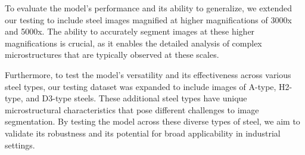 \documentclass[]{article}
\begin{document}
To evaluate the model's performance and its ability to generalize, we extended our testing to include steel images magnified at higher magnifications of 3000x and 5000x. The ability to accurately segment images at these higher magnifications is crucial, as it enables the detailed analysis of complex microstructures that are typically observed at these scales.

Furthermore, to test the model's versatility and its effectiveness across various steel types, our testing dataset was expanded to include images of A-type, H2-type, and D3-type steels. These additional steel types have unique microstructural characteristics that pose different challenges to image segmentation. By testing the model across these diverse types of steel, we aim to validate its robustness and its potential for broad applicability in industrial settings.
\end{document}
